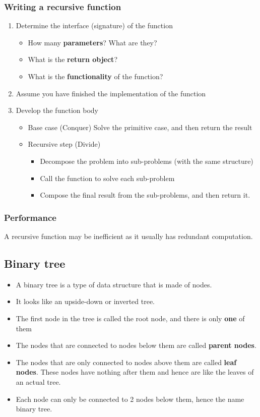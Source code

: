\documentclass[11pt]{article}
\begin{document}
\subsubsection{Writing a recursive function}
\label{sec:org6cdd364}
\begin{enumerate}
\item Determine the interface (signature) of the function
\begin{itemize}
\item How many \textbf{parameters}? What are they?
\item What is the \textbf{return object}?
\item What is the \textbf{functionality} of the function?
\end{itemize}

\item Assume you have finished the implementation of the function
\item Develop the function body
\begin{itemize}
\item Base case (Conquer)
Solve the primitive case, and then return the result
\item Recursive step (Divide)
\begin{itemize}
\item Decompose the problem into sub-problems (with the same structure)
\item Call the function to solve each sub-problem
\item Compose the final result from the sub-problems, and then return it.
\end{itemize}
\end{itemize}
\end{enumerate}
\subsubsection{Performance}
\label{sec:org25e2439}
A recursive function may be inefficient as it usually has redundant computation.
\subsection{Binary tree}
\label{sec:orgc692a2e}
\begin{itemize}
\item A binary tree is a type of data structure that is made of nodes.
\item It looks like an upside-down or inverted tree.
\item The first node in the tree is called the root node, and there is only \textbf{one} of them
\item The nodes that are connected to nodes below them are called \textbf{parent nodes}.
\item The nodes that are only connected to nodes above them are called \textbf{leaf nodes}. These nodes have nothing after them and hence are like the leaves of an actual tree.
\item Each node can only be connected to 2 nodes below them, hence the name binary tree.
\end{itemize}
\end{document}

